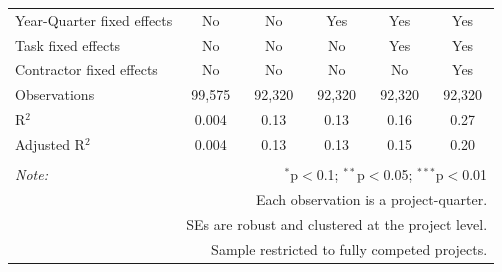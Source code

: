 \documentclass[
]{article}
\begin{document}
\begin{table}[H]
\begin{tabular}{@{\extracolsep{-2pt}}lccccc}
Year-Quarter fixed effects & No & No & Yes & Yes & Yes \\ 
Task fixed effects & No & No & No & Yes & Yes \\ 
Contractor fixed effects & No & No & No & No & Yes \\ 
Observations & 99,575 & 92,320 & 92,320 & 92,320 & 92,320 \\ 
R$^{2}$ & 0.004 & 0.13 & 0.13 & 0.16 & 0.27 \\ 
Adjusted R$^{2}$ & 0.004 & 0.13 & 0.13 & 0.15 & 0.20 \\ 
\hline 
\hline \\[-1.8ex] 
\textit{Note:}  & \multicolumn{5}{r}{$^{*}$p$<$0.1; $^{**}$p$<$0.05; $^{***}$p$<$0.01} \\ 
 & \multicolumn{5}{r}{Each observation is a project-quarter.} \\ 
 & \multicolumn{5}{r}{SEs are robust and clustered at the project level.} \\ 
 & \multicolumn{5}{r}{Sample restricted to fully competed projects.} \\ 
\end{tabular} 
\end{table}
\end{document}
